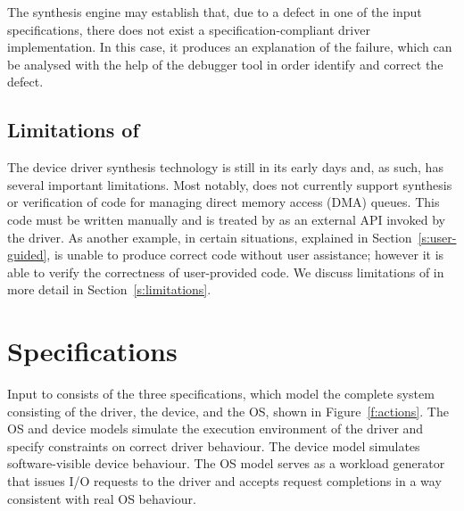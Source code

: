 The synthesis engine may establish that, due to a defect in one of the input specifications, there does not exist a specification-compliant driver implementation.  In this case, it produces an explanation of the failure, which can be analysed with the help of the \termite debugger tool in order identify and correct the defect.

        
%
%        
%        

\subsection{Limitations of \termite}  The device driver synthesis technology is still in its early days and, as such, has several important limitations.  Most notably, \termite does not currently support synthesis or verification of code for managing direct memory access (DMA) queues.  This code must be written manually and is treated by \termite as an external API invoked by the driver.  As another example, in certain situations, explained in Section~\ref{s:user-guided}, \termite is unable to produce correct code without user assistance; however it is able to verify the correctness of user-provided code.  We discuss limitations of \termite in more detail in Section~\ref{s:limitations}.

\section{Specifications}

\label{s:specifications}

Input to \termite consists of the three specifications, which model the complete system consisting of the driver, the device, and the OS, shown in Figure~\ref{f:actions}.  The OS and device models simulate the execution environment of the driver and specify constraints on correct driver behaviour.  The device model simulates software-visible device behaviour.  The OS model serves as a workload generator that issues I/O requests to the driver and accepts request completions in a way consistent with real OS behaviour.

